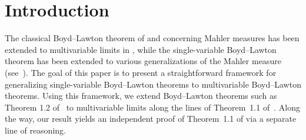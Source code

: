 \documentclass[12pt]{amsart}
\title {\TITLE}
\date{\today}
\author[Aitken]{Wayne Aitken}
\author[Ayers]{Kimberly Ayers}
\author[Smith]{Hanson Smith}
\theoremstyle{plain}
\theoremstyle{definition}
\theoremstyle{remark}
\numberwithin{theorem}{section}
\numberwithin{equation}{section} %
\begin{document}
\begin{abstract}
The classical Boyd--Lawton theorem concerning
Mahler measures has recently been
extended to multivariable limits by Brunault, Guilloux, Mehrabdollahei, and Pengo.
In another direction, the single-variable Boyd--Lawton theorem
has been generalized to various extensions of Mahler measure by Issa and Lal\'in.
The goal of this paper is to present a cohesive framework for extending single-variable Boyd--Lawton theorems
to multivariable Boyd--Lawton theorems. With this, we broaden the single-variable Boyd--Lawton theorems of Issa and Lal\'in
to multivariable versions in the direction of Brunault, Guilloux, Mehrabdollahei, and Pengo, providing a generalization of both works.


\end{abstract}

\maketitle



\section{Introduction} \label{intro}

The classical Boyd--Lawton theorem of  \citep{boyd1981} and \citep{lawton1983} concerning
Mahler measures has been
extended to multivariable limits in
\cite{Brunault2024}, while the single-variable Boyd--Lawton theorem
has been extended to various generalizations of the Mahler measure (see~\cite[Theorem~1.2]{Issa2013}).
The goal of this paper is to present a straightforward framework for generalizing single-variable Boyd--Lawton theorems
to multivariable Boyd--Lawton theorems. Using this framework, we extend Boyd--Lawton theorems such as Theorem 1.2 of~\cite{Issa2013} to multivariable limits along the lines of Theorem~1.1 of~\cite{Brunault2024}.
Along the way, our result yields an independent proof of Theorem~1.1 of \cite{Brunault2024} via a separate line of reasoning. 
\end{document}
